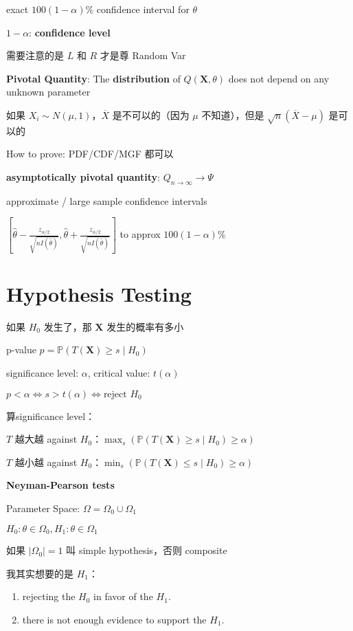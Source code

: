 \documentclass[9pt,landscape]{article}
\begin{document}
\begin{multicols}{3}
exact $100(1-\alpha)\%$ confidence interval for $\theta$

$1-\alpha$: \textbf{confidence level}

需要注意的是 $L$ 和 $R$ 才是尊 Random Var

\textbf{Pivotal Quantity}: The \textbf{distribution} of $Q(\boldsymbol{X}, \theta)$ does not depend on any unknown parameter

如果 $X_i\sim N(\mu, 1)$，$\overline{X}$ 是不可以的（因为 $\mu$ 不知道），但是 $\sqrt{n}(\overline{X}-\mu)$ 是可以的

How to prove: PDF/CDF/MGF 都可以

\textbf{asymptotically pivotal quantity}: $Q_{n\to\infty}\to\Psi$

approximate / large sample confidence intervals

$\left[\hat{\theta}-\frac{z_{\alpha/2}}{\sqrt{nI(\hat{\theta})}}, \hat{\theta}+\frac{z_{\alpha/2}}{\sqrt{nI(\hat{\theta})}}\right]$ to approx $100(1-\alpha)\%$

\section{Hypothesis Testing}

如果 $H_0$ 发生了，那 $\boldsymbol{X}$ 发生的概率有多小

p-value $p=\mathbb{P}(T(\boldsymbol{X})\ge s\mid H_0)$

significance level: $\alpha$, critical value: $t(\alpha)$

$p<\alpha\Leftrightarrow s>t(\alpha)\Leftrightarrow\text{reject } H_0$

算significance level：

$T$ 越大越 against $H_0$：$\max_s(\mathbb{P}(T(\boldsymbol{X})\ge s\mid H_0)\ge\alpha)$

$T$ 越小越 against $H_0$：$\min_s(\mathbb{P}(T(\boldsymbol{X})\le s\mid H_0)\ge\alpha)$

\textbf{Neyman-Pearson tests}

Parameter Space: $\Omega=\Omega_0\cup\Omega_1$

$H_0: \theta\in\Omega_0, H_1: \theta\in\Omega_1$

如果 $|\Omega_0|=1$ 叫 simple hypothesis，否则 composite

我其实想要的是 $H_1$：
\begin{enumerate}
	\item rejecting the $H_0$ in favor of the $H_1$.
	\item there is not enough evidence to support the $H_1$.
\end{enumerate}


\end{multicols}
\end{document}
